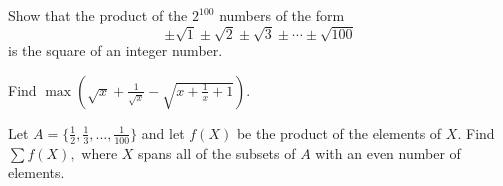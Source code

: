 \documentclass[mast]{lucky}
\begin{document}
\begin{req}[]{4}
Show that the product of the $2^{100}$ numbers of the form
\[\pm\sqrt{1}\pm\sqrt{2}\pm\sqrt{3}\pm\cdots\pm\sqrt{100}\]
is the square of an integer number.
\end{req}

\begin{prob}[]{6}
Find $\max\left(\sqrt{x}+\frac{1}{\sqrt{x}}-\sqrt{x+\frac{1}{x}+1}\right).$
\end{prob}

\begin{prob}[]{6}
Let $A=\{\frac{1}{2},\frac{1}{3},\ldots,\frac{1}{100}\}$ and let $f(X)$ be the product of the elements of $X.$ Find $\sum f(X),$ where $X$ spans all of the subsets of $A$ with an even number of elements.
\end{prob}
\end{document}
